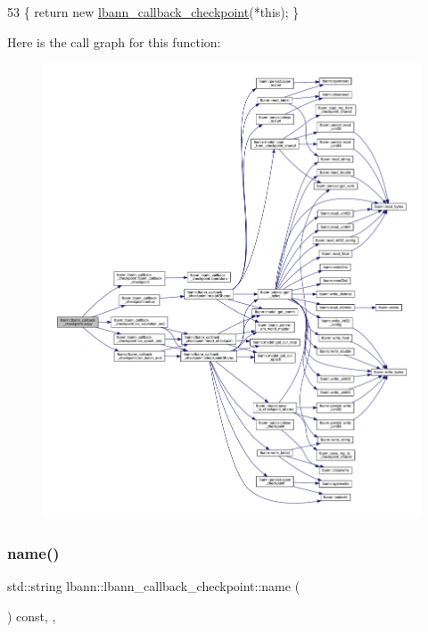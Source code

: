 \begin{DoxyCode}
53 \{ \textcolor{keywordflow}{return} \textcolor{keyword}{new} \hyperlink{classlbann_1_1lbann__callback__checkpoint_a865e633d1f041e3f2e5465b1d05f3603}{lbann\_callback\_checkpoint}(*\textcolor{keyword}{this}); \}
\end{DoxyCode}
Here is the call graph for this function\+:\nopagebreak
\begin{figure}[H]
\begin{center}
\leavevmode
\includegraphics[width=350pt]{classlbann_1_1lbann__callback__checkpoint_a63dc49f38f063f9b85d9abdf8b2855aa_cgraph}
\end{center}
\end{figure}
\mbox{\label{classlbann_1_1lbann__callback__checkpoint_aa1afa81c9638bf76fb6ecfe91d07a88e}} 
\subsubsection{\texorpdfstring{name()}{name()}}
{\footnotesize\ttfamily std\+::string lbann\+::lbann\+\_\+callback\+\_\+checkpoint\+::name (\begin{DoxyParamCaption}{ }\end{DoxyParamCaption}) const\hspace{0.3cm}{\ttfamily [inline]}, {\ttfamily [override]}, {\ttfamily [virtual]}}

